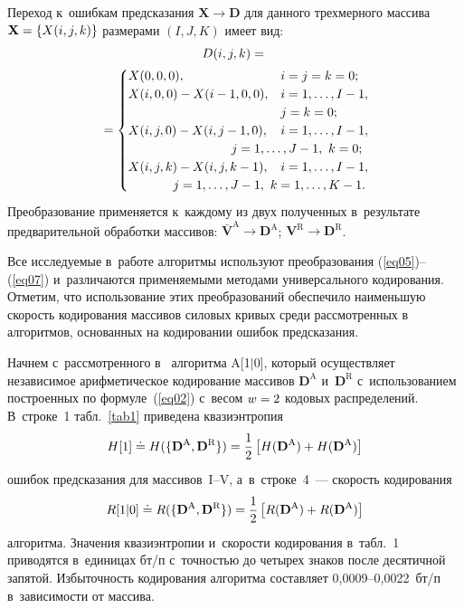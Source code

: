 \begin{multicols}{2}
Переход к~ошибкам предсказания $\mathbf{X}\to\mathbf{D}$ 
для данного трехмерного массива $\mathbf{X}\hm=\{X(i,j,k)\}$ размерами $(I,J,K)$ имеет вид:
\begin{multline}
D(i,j,k) ={}\\
\!\!{}=
\begin{cases}
X(0,0,0),                          & i=j=k=0; \\ 
X(i,0,0)-X(i-1,0,0), & i=1,\dots,I-1,\\
& j=k=0; \\
X(i,j,0)-X(i,j-1,0),  & i=1,\dots,I-1,\\
& \hspace*{-39pt}j=1,\dots,J-1,\ k=0; \\
X(i,j,k)-X(i,j,k-1),  & i=1,\dots,I-1,\\
& \hspace*{-85pt}j=1,\dots,J-1,\ k=1,\dots,K-1.
\end{cases}
\!\!\label{eq07}
\end{multline}
Преобразование применяется к~каждому из двух полученных в~результате предварительной 
обработки массивов: $\bar{\mathbf{V}}^\text{A}\to\mathbf{D}^\text{A}$; 
$\mathbf{V}^\text{R}\to\mathbf{D}^\text{R}$.

Все исследуемые в~работе алгоритмы используют преобразования (\ref{eq05})--(\ref{eq07}) и~различаются 
применяемыми методами универсального кодирования. Отметим, что использование этих 
преобразований обеспечило наименьшую скорость кодирования массивов силовых кривых 
среди рассмотренных в~\cite{b1} алгоритмов, основанных на кодировании ошибок предсказания.

Начнем с~рассмотренного в~\cite{b1} алгоритма A[1$\vert$0], который осуществляет 
независимое арифметическое кодирование массивов $\mathbf{D}^\text{A}$ и~$\mathbf{D}^\text{R}$ 
с~использованием построенных по формуле~(\ref{eq02}) с~весом $w\hm=2$ кодовых распределений. 
В~строке~1 табл.~\ref{tab1} приведена квазиэнтропия
$$
H[1]\doteq H(\{\mathbf{D}^\text{A}, \mathbf{D}^\text{R} \}) = 
\displaystyle\frac{\displaystyle 1\mathstrut}{\displaystyle 2\mathstrut}\left[H(\mathbf{D}^\text{A}) + H(\mathbf{D}^\text{A})\right]
$$
ошибок предсказания для массивов~I--V, а~в~строке~4~--- ско\-рость кодирования
$$
R[1\vert 0]\doteq R(\{\mathbf{D}^\text{A}, \mathbf{D}^\text{R} \}) = 
\displaystyle\frac{\displaystyle 1\mathstrut}{\displaystyle 2\mathstrut}\left[R(\mathbf{D}^\text{A}) + R(\mathbf{D}^\text{A})\right]
$$
алгоритма. Значения квазиэнтропии и~скорости кодирования в~табл.~1 
приводятся в~единицах бт/п с~точностью до четырех знаков после десятичной запятой. 
Избыточность кодирования алгоритма составляет 0,0009--0,0022~бт/п в~зависимости от массива.



\end{multicols}
